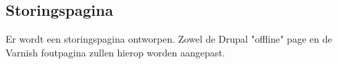 \subsection{Storingspagina}\label{storingspagina}

Er wordt een storingspagina ontworpen. Zowel de Drupal "offline" page en de Varnish foutpagina zullen hierop worden aangepast. 
